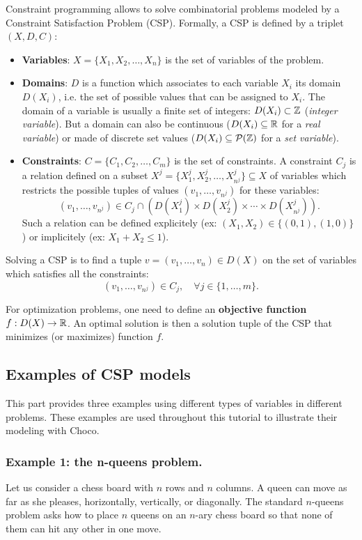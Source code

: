 Constraint programming allows to solve combinatorial problems modeled by a Constraint Satisfaction Problem (CSP). Formally, a CSP is defined by a triplet $(X,D,C)$:
\begin{itemize}
	\item \textbf{Variables}: $X = \{X_1,X_2,\ldots,X_n\}$ is the set of variables of the problem.
	\item \textbf{Domains}: $D$ is a function which associates to each variable $X_i$ its domain $D(X_i)$, i.e. the set of possible values that can be assigned to $X_i$. The domain of a variable is usually a finite set of integers: $D(X_i)\subset\mathbb{Z}$ (\emph{integer variable}). But a domain can also be continuous ($D(X_i)\subseteq\mathbb{R}$ for a \emph{real variable}) or made of discrete set values ($D(X_i)\subseteq\mathcal{P}(\mathbb{Z})$ for a \emph{set variable}).
	\item \textbf{Constraints}: $C = \{C_1,C_2,\ldots,C_m\}$ is the set of constraints. A constraint $C_j$ is a relation defined on a subset $X^j = \{X^j_1,X^j_2,\ldots,X^j_{n^j}\}\subseteq X$ of variables which restricts the possible tuples of values $(v_1,\ldots,v_{n^j})$ for these variables:
$$(v_1,\ldots,v_{n^j})\in C_j\cap (D(X^j_1)\times D(X^j_2)\times\cdots\times D(X^j_{n^j})).$$
Such a relation can be defined explicitely (ex: $(X_1,X_2)\in\{(0,1),(1,0)\}$) or implicitely (ex: $X_1+X_2\le 1$).
\end{itemize}

Solving a CSP is to find a tuple $v=(v_1,\ldots,v_{n})\in D(X)$ on the set of variables which satisfies all the constraints:
$$(v_1,\ldots,v_{n^j})\in C_j,\quad\forall j\in\{1,\ldots,m\}.$$

For optimization problems, one need to define an \textbf{objective function} $f:D(X)\rightarrow\mathbb{R}$. An optimal solution is then a solution tuple of the CSP that minimizes (or maximizes) function $f$.

\subsection{Examples of CSP models}\label{introduction:examples}\hypertarget{introduction:examples}{}
This part provides three examples using different types of variables in different problems. These examples are used throughout this tutorial to illustrate their modeling with Choco.

\subsubsection{Example 1: the n-queens problem.}\label{introduction:example1:nqueens}\hypertarget{introduction:example1:nqueens}{}
Let us consider a chess board with $n$ rows and $n$ columns. A queen can move as far as she pleases, horizontally, vertically, or diagonally. The standard $n$-queens problem asks how to place $n$ queens on an $n$-ary chess board so that none of them can hit any other in one move.

